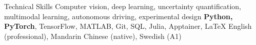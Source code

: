 \begin{rubric}{Technical Skills}
\entry*[Research]
	Computer vision, deep learning, uncertainty quantification, multimodal learning, autonomous driving, experimental design
\entry*[Programming]
	\textbf{Python, PyTorch}, TensorFlow, MATLAB, Git, SQL, Julia, Apptainer, \LaTeX
\entry*[Languages]
	English (professional), Mandarin Chinese (native), Swedish (A1)
\end{rubric}